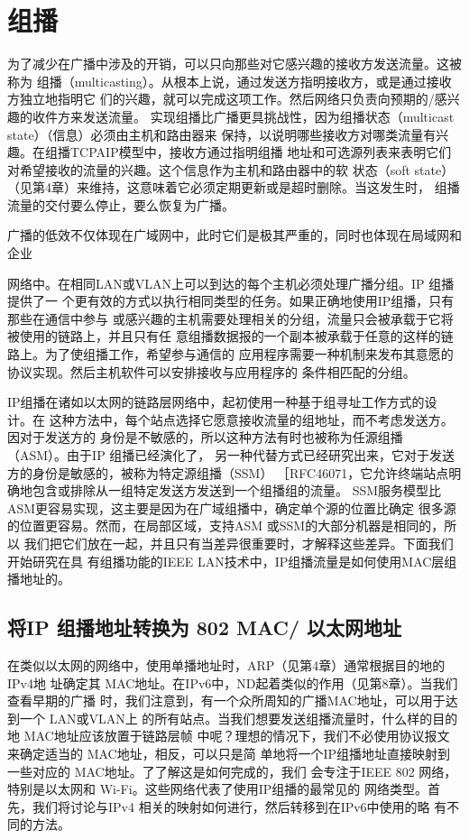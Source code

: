 \section{组播}
为了减少在广播中涉及的开销，可以只向那些对它感兴趣的接收方发送流量。这被称为
组播（multicasting）。从根本上说，通过发送方指明接收方，或是通过接收方独立地指明它
们的兴趣，就可以完成这项工作。然后网络只负责向预期的/感兴趣的收件方来发送流量。
实现组播比广播更具挑战性，因为组播状态（multicast state）（信息）必须由主机和路由器来
保持，以说明哪些接收方对哪类流量有兴趣。在组播TCPAIP模型中，接收方通过指明组播
地址和可选源列表来表明它们对希望接收的流量的兴趣。这个信息作为主机和路由器中的软
状态（soft state）（见第4章）来维持，这意味着它必须定期更新或是超时删除。当这发生时，
组播流量的交付要么停止，要么恢复为广播。

广播的低效不仅体现在广域网中，此时它们是极其严重的，同时也体现在局域网和企业

网络中。在相同LAN或VLAN上可以到达的每个主机必须处理广播分组。IP 组播提供了一
个更有效的方式以执行相同类型的任务。如果正确地使用IP组播，只有那些在通信中参与
或感兴趣的主机需要处理相关的分组，流量只会被承载于它将被使用的链路上，并且只有任
意组播数据报的一个副本被承载于任意的这样的链路上。为了使组播工作，希望参与通信的
应用程序需要一种机制来发布其意愿的协议实现。然后主机软件可以安排接收与应用程序的
条件相匹配的分组。

IP组播在诸如以太网的链路层网络中，起初使用一种基于组寻址工作方式的设计。在
这种方法中，每个站点选择它愿意接收流量的组地址，而不考虑发送方。因对于发送方的
身份是不敏感的，所以这种方法有时也被称为任源组播（ASM）。由于IP 组播已经演化了，
另一种代替方式已经研究出来，它对于发送方的身份是敏感的，被称为特定源组播（SSM）
［RFC46071，它允许终端站点明确地包含或排除从一组特定发送方发送到一个组播组的流量。
SSM服务模型比 ASM更容易实现，这主要是因为在广域组播中，确定单个源的位置比确定
很多源的位置更容易。然而，在局部区域，支持ASM 或SSM的大部分机器是相同的，所以
我们把它们放在一起，并且只有当差异很重要时，才解释这些差异。下面我们开始研究在具
有组播功能的IEEE LAN技术中，IP组播流量是如何使用MAC层组播地址的。

\subsection{将IP 组播地址转换为 802 MAC/ 以太网地址}

在类似以太网的网络中，使用单播地址时，ARP（见第4章）通常根据目的地的IPv4地
址确定其 MAC地址。在IPv6中，ND起着类似的作用（见第8章）。当我们查看早期的广播
时，我们注意到，有一个众所周知的广播MAC地址，可以用于达到一个 LAN或VLAN上
的所有站点。当我们想要发送组播流量时，什么样的目的地 MAC地址应该放置于链路层帧
中呢？理想的情况下，我们不必使用协议报文来确定适当的 MAC地址，相反，可以只是简
单地将一个IP组播地址直接映射到一些对应的 MAC地址。了了解这是如何完成的，我们
会专注于IEEE 802 网络，特别是以太网和 Wi-Fi。这些网络代表了使用IP组播的最常见的
网络类型。首先，我们将讨论与IPv4 相关的映射如何进行，然后转移到在IPv6中使用的略
有不同的方法。

